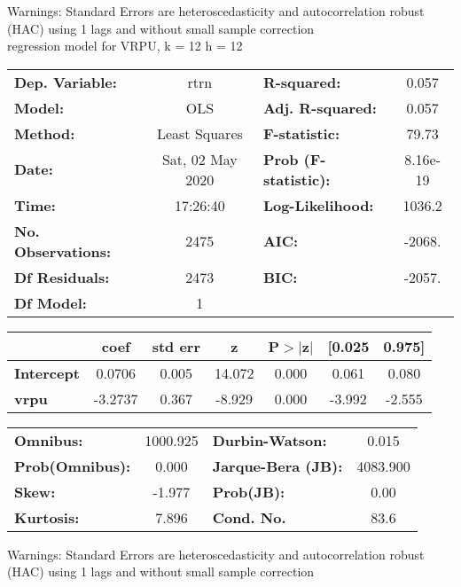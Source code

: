 Warnings: \newline
 [1] Standard Errors are heteroscedasticity and autocorrelation robust (HAC) using 1 lags and without small sample correction\\ 

regression model for VRPU, k = 12 h = 12\begin{center}
\begin{tabular}{lclc}
\toprule
\textbf{Dep. Variable:}    &       rtrn       & \textbf{  R-squared:         } &     0.057   \\
\textbf{Model:}            &       OLS        & \textbf{  Adj. R-squared:    } &     0.057   \\
\textbf{Method:}           &  Least Squares   & \textbf{  F-statistic:       } &     79.73   \\
\textbf{Date:}             & Sat, 02 May 2020 & \textbf{  Prob (F-statistic):} &  8.16e-19   \\
\textbf{Time:}             &     17:26:40     & \textbf{  Log-Likelihood:    } &    1036.2   \\
\textbf{No. Observations:} &        2475      & \textbf{  AIC:               } &    -2068.   \\
\textbf{Df Residuals:}     &        2473      & \textbf{  BIC:               } &    -2057.   \\
\textbf{Df Model:}         &           1      & \textbf{                     } &             \\
\bottomrule
\end{tabular}
\begin{tabular}{lcccccc}
                   & \textbf{coef} & \textbf{std err} & \textbf{z} & \textbf{P$> |$z$|$} & \textbf{[0.025} & \textbf{0.975]}  \\
\midrule
\textbf{Intercept} &       0.0706  &        0.005     &    14.072  &         0.000        &        0.061    &        0.080     \\
\textbf{vrpu}      &      -3.2737  &        0.367     &    -8.929  &         0.000        &       -3.992    &       -2.555     \\
\bottomrule
\end{tabular}
\begin{tabular}{lclc}
\textbf{Omnibus:}       & 1000.925 & \textbf{  Durbin-Watson:     } &    0.015  \\
\textbf{Prob(Omnibus):} &   0.000  & \textbf{  Jarque-Bera (JB):  } & 4083.900  \\
\textbf{Skew:}          &  -1.977  & \textbf{  Prob(JB):          } &     0.00  \\
\textbf{Kurtosis:}      &   7.896  & \textbf{  Cond. No.          } &     83.6  \\
\bottomrule
\end{tabular}
\end{center}

Warnings: \newline
 [1] Standard Errors are heteroscedasticity and autocorrelation robust (HAC) using 1 lags and without small sample correction\\ 

